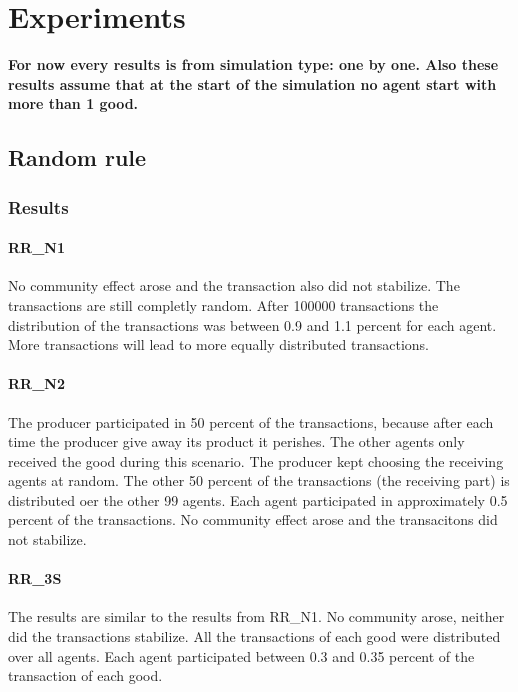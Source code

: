 \documentclass[twoside,openright]{uva-bachelor-thesis}
\begin{document}
\chapter{Experiments}
\textbf{For now every results is from simulation type: one by one. Also these results assume that at the start of the simulation no agent start with more than 1 good.}
\section{Random rule}

\subsection{Results}

\subsubsection{RR\_N1}
No community effect arose and the transaction also did not stabilize. The transactions are still completly random. After 100000 transactions the distribution of the transactions was between 0.9 and 1.1 percent for each agent. More transactions will lead to more equally distributed transactions.

\subsubsection{RR\_N2}
The producer participated in 50 percent of the transactions, because after each time the producer give away its product it perishes. The other agents only received the good during this scenario. The producer kept choosing the receiving agents at random. The other 50 percent of the transactions (the receiving part) is distributed oer the other 99 agents. Each agent participated in approximately 0.5 percent of the transactions. No community effect arose and the transacitons did not stabilize.

\subsubsection{RR\_3S}
The results are similar to the results from RR\_N1. No community arose, neither did the transactions stabilize. All the transactions of each good were distributed over all agents. Each agent participated between 0.3 and 0.35 percent of the transaction of each good.
\end{document}
